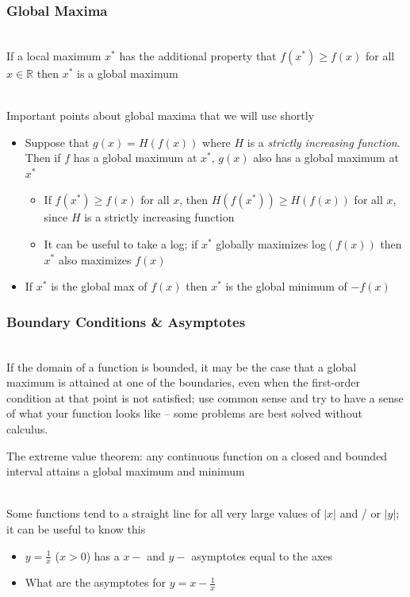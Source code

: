\documentclass{beamer}
\numberwithin{equation}{section}
\begin{document}
\begin{frame}
\frametitle{Global Maxima}

\ \\If a local maximum $x^*$ has the additional property that $f(x^*)\geq f(x)$ for all $x\in \mathbb{R}$ then $x^*$ is a global maximum \pause

\ \\Important points about global maxima that we will use shortly \pause

\begin{itemize}
\item Suppose that $g(x)=H(f(x))$ where $H$ is a \textit{strictly increasing function}.  Then if $f$ has a global maximum at $x^*$, $g(x)$ also has a global maximum at $x^*$ \pause
\begin{itemize}
\item If $f(x^*)\geq f(x)$ for all $x$, then $H(f(x^*))\geq H(f(x))$ for all $x$, since $H$ is a strictly increasing function \pause
\item It can be useful to take a log; if $x^*$ globally maximizes log$(f(x))$ then $x^*$ also maximizes $f(x)$ \pause
\end{itemize}

\item If $x^*$ is the global max of $f(x)$ then $x^*$ is the global minimum of $-f(x)$ \pause
\end{itemize}

\end{frame}



\begin{frame}
\frametitle{Boundary Conditions \& Asymptotes}

\ \\ If the domain of a function is bounded, it may be the case that a global maximum is attained at one of the boundaries, even when the first-order condition at that point is not satisfied; use common sense and try to have a sense of what your function looks like -- some problems are best solved without calculus. \pause

\begin{theorem}
The extreme value theorem:  any continuous function on a closed and bounded interval attains a global maximum and minimum
\end{theorem} \pause

\ \\Some functions tend to a straight line for all very large values of $|x|$ and / or  $|y|$; it can be useful to know this \pause

\begin{itemize}
\item $y={\frac{1}{x}}$ ($x>0$) has a $x-$ and $y-$ asymptotes equal to the axes \pause
\item What are the asymptotes for $y=x-{\frac{1}{x}}$ %
\end{itemize}

\end{frame}
\end{document}

